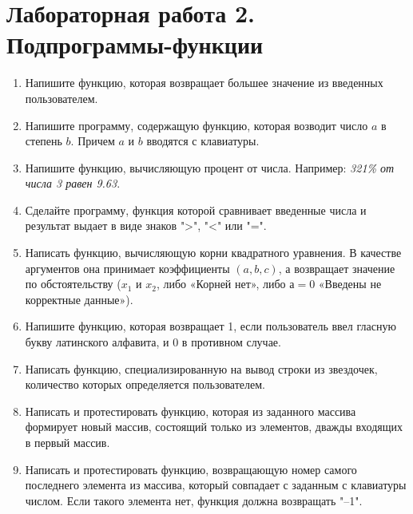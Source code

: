 \section{Лабораторная работа 2. Подпрограммы-функции}
\begin{enumerate}[leftmargin=*]
    \item Напишите функцию, которая возвращает большее значение из введенных пользователем.
    \item Напишите программу, содержащую функцию, которая возводит число $a$ в степень $b$. Причем $a$ и $b$ вводятся с клавиатуры.
    \item Напишите функцию, вычисляющую процент от числа. Например: \textit{321\% от числа 3 равен 9.63}.
    \item Сделайте программу, функция которой сравнивает введенные числа и результат выдает в виде знаков ">", "<" или "=".
    \item Написать функцию, вычисляющую корни квадратного уравнения. В качестве аргументов она принимает коэффициенты $(a, b, c)$, а возвращает значение по обстоятельству ($x_1$ и $x_2$, либо «Корней нет», либо $а=0$ «Введены не корректные данные»).
    \item Напишите функцию, которая возвращает 1, если пользователь ввел гласную букву латинского алфавита, и 0 в противном случае.
    \item Написать функцию, специализированную на вывод строки из звездочек, количество которых определяется пользователем.
    \item Написать и протестировать функцию, которая из заданного массива формирует новый массив, состоящий только из элементов, дважды входящих в первый массив.
    \item Написать и протестировать функцию, возвращающую номер самого последнего элемента из массива, который совпадает с заданным с клавиатуры числом. Если такого элемента нет, функция должна возвращать "–1".
\end{enumerate}
